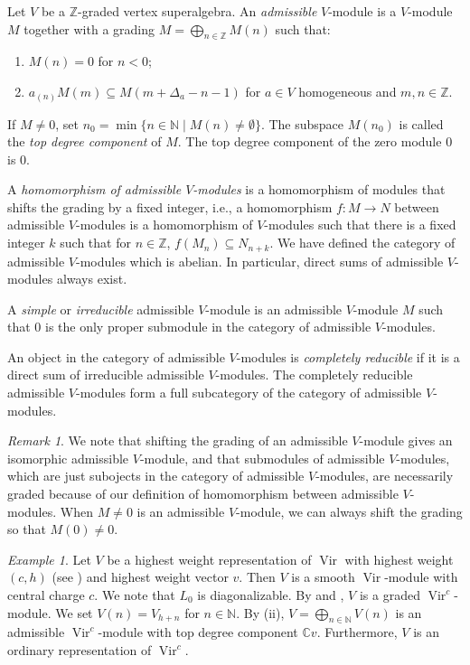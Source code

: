 \documentclass[a4paper, 12pt, reqno]{amsart}
\theoremstyle{remark}
\newtheorem{remark}[theorem]{Remark}
\newtheorem{example}[theorem]{Example}
\numberwithin{equation}{subsection}
\DeclareMathOperator{\Vir}{Vir}
\begin{document}
Let $V$ be a $\mathbb{Z}$-graded vertex superalgebra.
An \emph{admissible} $V$-module is a $V$-module $M$ together with a grading $M = \bigoplus_{n \in \mathbb{Z}}M(n)$ such that:
\begin{enumerate}
  \item $M(n) = 0$ for $n < 0$;
  \item $a_{(n)}M(m) \subseteq M(m + \Delta_a - n - 1)$ for $a \in V$ homogeneous and $m, n \in \mathbb{Z}$.
\end{enumerate}
If $M \neq 0$, set $n_0 = \min\{n \in \mathbb{N} \mid M(n) \neq \emptyset\}$.
The subspace $M(n_0)$ is called the \emph{top degree component} of $M$.
The top degree component of the zero module $0$ is $0$.

A \emph{homomorphism of admissible $V$-modules} is a homomorphism of modules that shifts the grading by a fixed integer, i.e., a homomorphism $f: M \to N$ between admissible $V$-modules is a homomorphism of $V$-modules such that there is a fixed integer $k$ such that for $n \in \mathbb{Z}$, $f(M_n) \subseteq N_{n + k}$.
We have defined the category of admissible $V$-modules which is abelian.
In particular, direct sums of admissible $V$-modules always exist.

A \emph{simple} or \emph{irreducible} admissible $V$-module is an admissible $V$-module $M$ such that $0$ is the only proper submodule in the category of admissible $V$-modules.

An object in the category of admissible $V$-modules is \emph{completely reducible} if it is a direct sum of irreducible admissible $V$-modules.
The completely reducible admissible $V$-modules form a full subcategory of the category of admissible $V$-modules.

\begin{remark}
  \label{rmk:24}
  We note that shifting the grading of an admissible $V$-module gives an isomorphic admissible $V$-module, and that submodules of admissible $V$-modules, which are just subojects in the category of admissible $V$-modules, are necessarily graded because of our definition of homomorphism between admissible $V$-modules.
  When $M \neq 0$ is an admissible $V$-module, we can always shift the grading so that $M(0) \neq 0$.
\end{remark}

\begin{example}
  \label{exa:11}
  Let $V$ be a highest weight representation of $\Vir$ with highest weight $(c, h)$ (see ) and highest weight vector $v$.
  Then $V$ is a smooth $\Vir$-module with central charge $c$.
  We note that $L_0$ is diagonalizable.
  By  and , $V$ is a graded $\Vir^c$-module.
  We set $V(n) = V_{h + n}$ for $n \in \mathbb{N}$.
  By (ii), $V = \bigoplus_{n \in \mathbb{N}}V(n)$ is an admissible $\Vir^c$-module with top degree component $\mathbb{C}v$.
  Furthermore, $V$ is an ordinary representation of $\Vir^c$.
\end{example}
\end{document}
